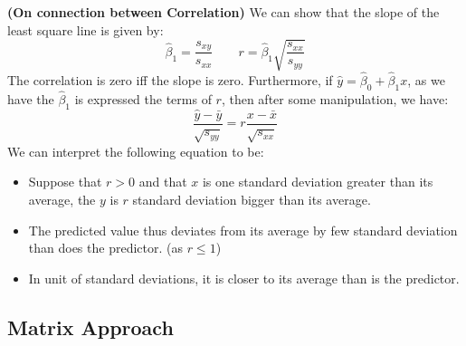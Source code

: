 \begin{remark}{\textbf{(On connection between Correlation)}}
    We can show that the slope of the least square line is given by:
    \begin{equation*}
        \hat{\beta}_1 = \frac{s_{xy}}{s_{xx}} \qquad r = \hat{\beta}_1\sqrt{\frac{s_{xx}}{s_{yy}}}
    \end{equation*}
    The correlation is zero iff the slope is zero. Furthermore, if $\hat{y} = \hat{\beta}_0 + \hat{\beta}_1x$, as we have the $\hat{\beta}_1$ is expressed the terms of $r$, then after some manipulation, we have:
    \begin{equation*}
        \frac{\hat{y} - \bar{y}}{\sqrt{s_{yy}}} = r\frac{x-\bar{x}}{\sqrt{s_{xx}}}
    \end{equation*}
    We can interpret the following equation to be:
    \begin{itemize}
        \item Suppose that $r>0$ and that $x$ is one standard deviation greater than its average, the $y$ is $r$ standard deviation bigger than its average. 
        \item The predicted value thus deviates from its average by few standard deviation than does the predictor. (as $r\le 1$)
        \item In unit of standard deviations, it is closer to its average than is the predictor. 
    \end{itemize}
\end{remark}

\subsection{Matrix Approach}

